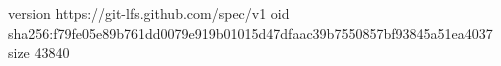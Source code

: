 version https://git-lfs.github.com/spec/v1
oid sha256:f79fe05e89b761dd0079e919b01015d47dfaac39b7550857bf93845a51ea4037
size 43840
